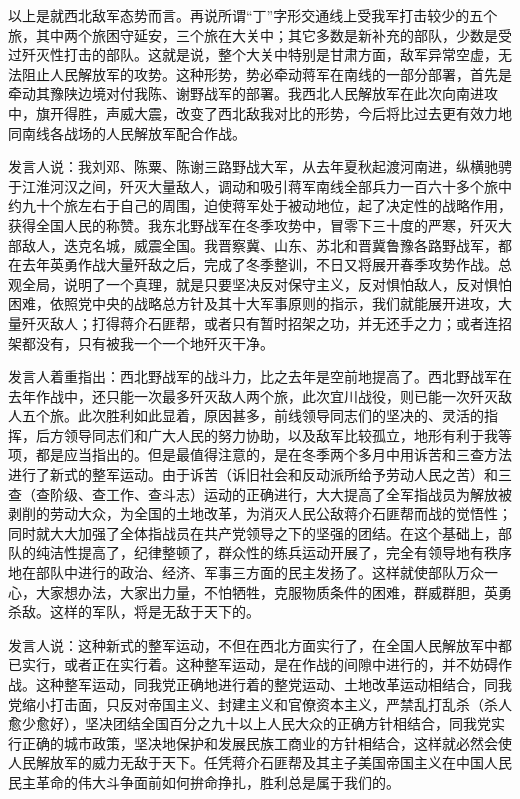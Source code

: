 以上是就西北敌军态势而言。再说所谓“丁”字形交通线上受我军打击较少的五个旅，其中两个旅困守延安，三个旅在大关中；其它多数是新补充的部队，少数是受过歼灭性打击的部队。这就是说，整个大关中特别是甘肃方面，敌军异常空虚，无法阻止人民解放军的攻势。这种形势，势必牵动蒋军在南线的一部分部署，首先是牵动其豫陕边境对付我陈、谢野战军的部署。我西北人民解放军在此次向南进攻中，旗开得胜，声威大震，改变了西北敌我对比的形势，今后将比过去更有效力地同南线各战场的人民解放军配合作战。

发言人说：我刘邓、陈粟、陈谢三路野战大军，从去年夏秋起渡河南进，纵横驰骋于江淮河汉之间，歼灭大量敌人，调动和吸引蒋军南线全部兵力一百六十多个旅中约九十个旅左右于自己的周围，迫使蒋军处于被动地位，起了决定性的战略作用，获得全国人民的称赞。我东北野战军在冬季攻势中，冒零下三十度的严寒，歼灭大部敌人，迭克名城，威震全国。我晋察冀、山东、苏北和晋冀鲁豫各路野战军，都在去年英勇作战大量歼敌之后，完成了冬季整训，不日又将展开春季攻势作战。总观全局，说明了一个真理，就是只要坚决反对保守主义，反对惧怕敌人，反对惧怕困难，依照党中央的战略总方针及其十大军事原则的指示，我们就能展开进攻，大量歼灭敌人；打得蒋介石匪帮，或者只有暂时招架之功，并无还手之力；或者连招架都没有，只有被我一个一个地歼灭干净。

发言人着重指出：西北野战军的战斗力，比之去年是空前地提高了。西北野战军在去年作战中，还只能一次最多歼灭敌人两个旅，此次宜川战役，则已能一次歼灭敌人五个旅。此次胜利如此显着，原因甚多，前线领导同志们的坚决的、灵活的指挥，后方领导同志们和广大人民的努力协助，以及敌军比较孤立，地形有利于我等项，都是应当指出的。但是最值得注意的，是在冬季两个多月中用诉苦和三查方法进行了新式的整军运动。由于诉苦（诉旧社会和反动派所给予劳动人民之苦）和三查（查阶级、查工作、查斗志）运动的正确进行，大大提高了全军指战员为解放被剥削的劳动大众，为全国的土地改革，为消灭人民公敌蒋介石匪帮而战的觉悟性；同时就大大加强了全体指战员在共产党领导之下的坚强的团结。在这个基础上，部队的纯洁性提高了，纪律整顿了，群众性的练兵运动开展了，完全有领导地有秩序地在部队中进行的政治、经济、军事三方面的民主发扬了。这样就使部队万众一心，大家想办法，大家出力量，不怕牺牲，克服物质条件的困难，群威群胆，英勇杀敌。这样的军队，将是无敌于天下的。

发言人说：这种新式的整军运动，不但在西北方面实行了，在全国人民解放军中都已实行，或者正在实行着。这种整军运动，是在作战的间隙中进行的，并不妨碍作战。这种整军运动，同我党正确地进行着的整党运动、土地改革运动相结合，同我党缩小打击面，只反对帝国主义、封建主义和官僚资本主义，严禁乱打乱杀（杀人愈少愈好），坚决团结全国百分之九十以上人民大众的正确方针相结合，同我党实行正确的城市政策，坚决地保护和发展民族工商业的方针相结合，这样就必然会使人民解放军的威力无敌于天下。任凭蒋介石匪帮及其主子美国帝国主义在中国人民民主革命的伟大斗争面前如何拚命挣扎，胜利总是属于我们的。


